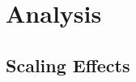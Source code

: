 \documentclass{article}
\theoremstyle{plain}
\theoremstyle{definition}
\theoremstyle{remark}
\begin{document}
\section{Analysis}

\subsection{Scaling Effects}



\end{document}

